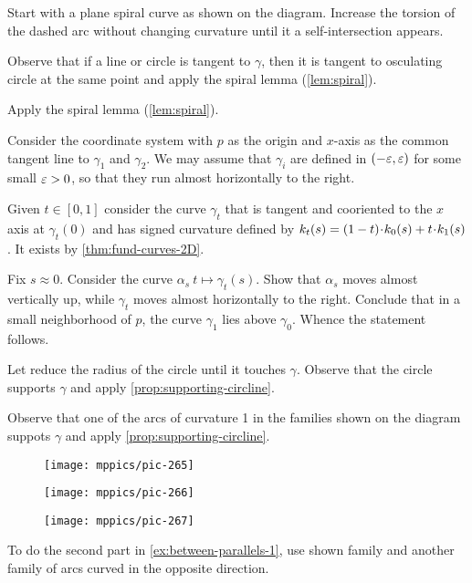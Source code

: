  Start with a plane spiral curve as shown on the diagram.
Increase the torsion of the dashed arc without changing curvature until it a self-intersection appears.

Observe that if a line or circle is tangent to $\gamma$,
then it is tangent to osculating circle at the same point
and apply the spiral lemma (\ref{lem:spiral}).

Apply the spiral lemma (\ref{lem:spiral}).

 Consider the coordinate system with $p$ as the origin and $x$-axis as the common tangent line to $\gamma_1$ and $\gamma_2$.
We may assume that $\gamma_i$ are defined in $(-\varepsilon,\varepsilon)$ for some small $\varepsilon>0$,
so that they run almost horizontally to the right.

Given $t\in[0,1]$ consider the curve $\gamma_t$ that is tangent and cooriented to the $x$ axis at  $\gamma_t(0)$ and has signed curvature defined by $\skur_t(s)=(1-t)\cdot\skur_0(s)+t\cdot\skur_1(s)$.
It exists by \ref{thm:fund-curves-2D}.

Fix $s\approx 0$.
Consider the curve $\alpha_s\:t\mapsto \gamma_t(s)$.
Show that $\alpha_s$ moves almost vertically up, while $\gamma_t$ moves almost horizontally to the right.
Conclude that in a small neighborhood of $p$, the curve $\gamma_1$
lies above $\gamma_0$.
Whence the statement follows.

 Let reduce the radius of the circle until it touches $\gamma$.
Observe that the circle supports $\gamma$ and apply \ref{prop:supporting-circline}.


Observe that one of the arcs of curvature 1 in the families shown on the diagram suppots $\gamma$ and apply \ref{prop:supporting-circline}.
\begin{figure}[h!]
\begin{minipage}{.50\textwidth}
\centering
\texttt{[image: mppics/pic-265]}
\end{minipage}\hfill
\begin{minipage}{.26\textwidth}
\centering
\texttt{[image: mppics/pic-266]}
\end{minipage}
\hfill
\begin{minipage}{.20\textwidth}
\centering
\texttt{[image: mppics/pic-267]}
\end{minipage}
\end{figure}
To do the second part in \ref{ex:between-parallels-1}, use shown family and another family of arcs curved in the opposite direction.

